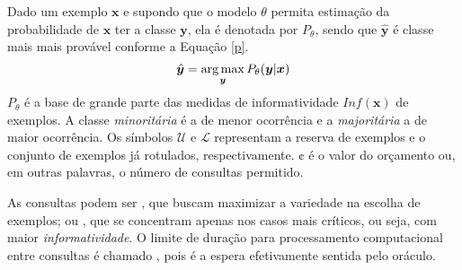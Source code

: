 Dado um exemplo $\bm{x}$ e supondo que o modelo $\theta$ permita
estimação da probabilidade de $\bm{x}$ ter a classe $\bm{y}$,
ela é denotada por $P_{\theta}$,
sendo que $\hat{\bm{y}}$ é classe mais mais provável conforme a Equação \ref{p}.
\begin{equation}\label{p}
  \hat{\bm{y}} = \operatorname*{arg\,max}_{\bm{y}} P_{\theta} (\bm{y}|\bm{x})
\end{equation}
$P_{\theta}$ é a base de grande parte das medidas de informatividade $Inf(\bm{x})$ de exemplos.
A classe \textit{minoritária} é a de menor ocorrência e a \textit{majoritária} a de maior ocorrência.
Os símbolos $\mathcal{U}$ e $\mathcal{L}$ representam a
reserva de exemplos \citep{series/synthesis/2012Settles}
e o conjunto de exemplos já rotulados, respectivamente.
$\cent$ é o valor do orçamento ou, em outras palavras, o número de consultas permitido.




As consultas podem ser , que buscam maximizar
a variedade na escolha de exemplos; ou ,
que se concentram apenas nos casos mais críticos,
ou seja, com maior \textit{informatividade}.
O limite de duração para processamento computacional entre consultas
é chamado ,
pois é a espera efetivamente sentida pelo oráculo.
